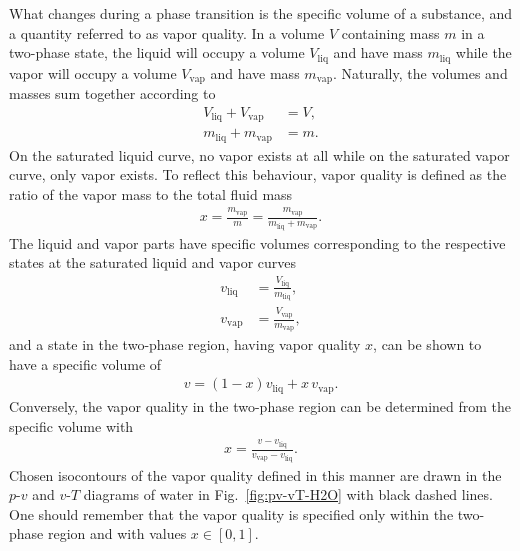 What changes during a phase transition is the specific volume of a substance, and a quantity referred to as vapor quality. In a volume $V$ containing mass $m$ in a two-phase state, the liquid will occupy a volume $V_\text{liq}$ and have mass $m_\text{liq}$ while the vapor will occupy a volume $V_\text{vap}$ and have mass $m_\text{vap}$. Naturally, the volumes and masses sum together according to
\begin{align}
    V_\text{liq}+V_\text{vap}&=V,\\
    m_\text{liq}+m_\text{vap}&=m.
\end{align}
On the saturated liquid curve, no vapor exists at all while on the saturated vapor curve, only vapor exists. To reflect this behaviour, vapor quality is defined as the ratio of the vapor mass to the total fluid mass
\begin{align}
    x=\frac{m_\text{vap}}{m}=\frac{m_\text{vap}}{m_\text{liq}+m_\text{vap}}.
\end{align}
The liquid and vapor parts have specific volumes corresponding to the respective states at the saturated liquid and vapor curves 
\begin{align}
    v_\text{liq}&=\frac{V_\text{liq}}{m_\text{liq}},\\
    v_\text{vap}&=\frac{V_\text{vap}}{m_\text{vap}}, 
\end{align}
and a state in the two-phase region, having vapor quality $x$, can be shown to have a specific volume of
\begin{align}
    v=(1-x)v_\text{liq}+x\,v_\text{vap}.
\end{align}
Conversely, the vapor quality in the two-phase region can be determined from the specific volume with
\begin{align}
    x=\frac{v-v_\text{liq}}{v_\text{vap}-v_\text{liq}}.
\end{align}
Chosen isocontours of the vapor quality defined in this manner are drawn in the $p$-$v$ and $v$-$T$ diagrams of water in Fig.~\ref{fig:pv-vT-H2O} with black dashed lines. One should remember that the vapor quality is specified only within the two-phase region and with values $x\in[0,1]$.

